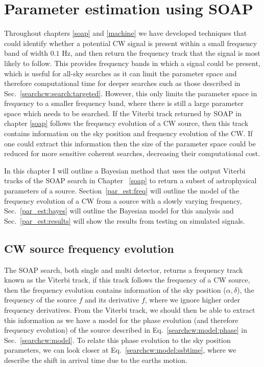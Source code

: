 \chapter{\label{par_est}Parameter estimation using SOAP}

Throughout chapters \ref{soap} and \ref{machine} we have developed
techniques that could identify whether a potential \gls{CW}
signal is present within a small frequency band of width $0.1$ Hz, and then
return the frequency track that the signal is most likely to follow.  This
provides frequency bands in which a signal could be present, which is useful
for all-sky searches as it can limit the parameter space and therefore
computational time for deeper searches such as those described in
Sec.~\ref{searchcw:search:targeted}.  However, this only limits the parameter
space in frequency to a smaller frequency band, where there is still a large
parameter space which needs to be searched.  If the Viterbi track returned by
SOAP in chapter \ref{soap} follows the frequency evolution of a \gls{CW}
source, then this track contains information on the sky position and frequency
evolution of the \gls{CW}.  If one could extract this information then the size
of the parameter space could be reduced for more sensitive coherent searches, decreasing their computational cost.

In this chapter I will outline a Bayesian method that uses the output Viterbi tracks of the SOAP search in Chapter
~\ref{soap} to return a subset of astrophysical parameters of a
source.  Section~\ref{par_est:freq} will outline the model of the frequency
evolution of a \gls{CW} from a source with a slowly varying frequency,
Sec.~\ref{par_est:bayes} will outline the Bayesian model for this analysis and
Sec.~\ref{par_est:results} will show the results from testing on simulated
signals.

\section{\label{par_est:freq}\gls{CW} source frequency evolution}

The SOAP search, both single and multi detector, returns a frequency track known as the Viterbi track, if this
track follows the frequency of a \gls{CW} source, then the frequency evolution
contains information of the sky position ($\alpha, \delta$), the frequency of
the source $f$ and its derivative $\dot{f}$, where we ignore higher order
frequency derivatives.  From the Viterbi track, we should then be able to
extract this information as we have a model for the phase evolution (and
therefore frequency evolution) of the source described in
Eq.~\ref{searchcw:model:phase} in Sec.~\ref{searchcw:model}.  To relate this
phase evolution to the sky position parameters, we can look closer at
Eq.~\ref{searchcw:model:ssbtime}, where we describe the shift in arrival time
due to the earths motion.

